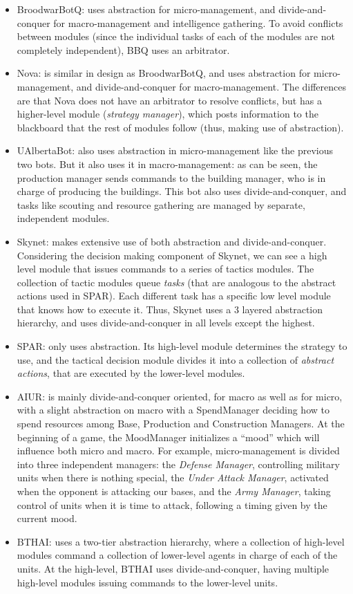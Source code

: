 \documentclass[journal]{IEEEtran}
\begin{document}
\begin{itemize}
\item BroodwarBotQ: uses abstraction for micro-management, and divide-and-conquer for macro-management and intelligence gathering. To avoid conflicts between modules (since the individual tasks of each of the modules are not completely independent), BBQ uses an arbitrator.
\item Nova: is similar in design as BroodwarBotQ, and uses abstraction for micro-management, and divide-and-conquer for macro-management. The differences are that Nova does not have an arbitrator to resolve conflicts, but has a higher-level module ({\em strategy manager}), which posts information to the blackboard that the rest of modules follow (thus, making use of abstraction).
\item UAlbertaBot: also uses abstraction in micro-management like the previous two bots. But it also uses it in macro-management: as can be seen, the production manager sends commands to the building manager, who is in charge of producing the buildings. This bot also uses divide-and-conquer, and tasks like scouting and resource gathering are managed by separate, independent modules.
\item Skynet: makes extensive use of both abstraction and divide-and-conquer. Considering the decision making component of Skynet, we can see a high level module that issues commands to a series of tactics modules. The collection of tactic modules queue {\em tasks} (that are analogous to the abstract actions used in SPAR). Each different task has a specific low level module that knows how to execute it. Thus, Skynet uses a 3 layered abstraction hierarchy, and uses divide-and-conquer in all levels except the highest.
\item SPAR: only uses abstraction. Its high-level module determines the strategy to use, and the tactical decision module divides it into a collection of {\em abstract actions}, that are executed by the lower-level modules.
\item AIUR: is mainly divide-and-conquer oriented, for macro as well as for micro, with a slight abstraction on macro with a SpendManager deciding how to spend resources among Base, Production and Construction Managers. At the beginning of a game, the MoodManager initializes a ``mood'' which will influence both micro and macro. For example, micro-management is divided into three independent managers: the {\em Defense Manager}, controlling military units when there is nothing special, the {\em Under Attack Manager}, activated when the opponent is attacking our bases, and the {\em Army Manager}, taking control of units when it is time to attack, following a timing given by the current mood.
\item BTHAI: uses a two-tier abstraction hierarchy, where a collection of high-level modules command a collection of lower-level agents in charge of each of the units. At the high-level, BTHAI uses divide-and-conquer, having multiple high-level modules issuing commands to the lower-level units.
\end{itemize}
\end{document}
